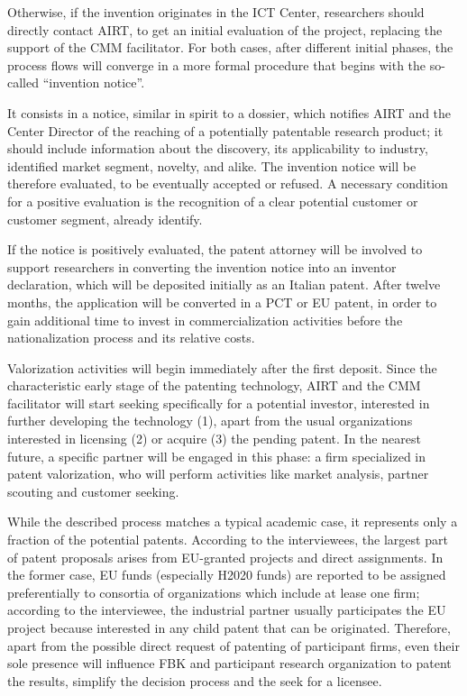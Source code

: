 Otherwise, if the invention originates in the ICT Center, researchers should directly contact AIRT, to get an initial evaluation of the project, replacing the support of the CMM facilitator. For both cases, after different initial phases, the process flows will converge in a more formal procedure that begins with the so-called \enquote{invention notice}. 

It consists in a notice, similar in spirit to a dossier, which notifies AIRT and the Center Director of the reaching of a potentially patentable research product; it should include information about the discovery, its applicability to industry, identified market segment, novelty, and alike. The invention notice will be therefore evaluated, to be eventually accepted or refused. A necessary condition for a positive evaluation is the recognition of a clear potential customer or customer segment, already identify.

If the notice is positively evaluated, the patent attorney will be involved to support researchers in converting the invention notice into an inventor declaration, which will be deposited initially as an Italian patent. After twelve months, the application will be converted in a PCT or EU patent, in order to gain additional time to invest in commercialization activities before the nationalization process and its relative costs.

Valorization activities will begin immediately after the first deposit. Since the characteristic early stage of the patenting technology, AIRT and the CMM facilitator will start seeking specifically for a potential investor, interested in further developing the technology (1), apart from the usual organizations interested in licensing (2) or acquire (3) the pending patent. In the nearest future, a specific partner will be engaged in this phase: a firm specialized in patent valorization, who will perform activities like market analysis, partner scouting and customer seeking. 

While the described process matches a typical academic case, it represents only a fraction of the potential patents. According to the interviewees, the largest part of patent proposals arises from EU-granted projects and direct assignments. In the former case, EU funds (especially H2020 funds) are reported to be assigned preferentially to consortia of organizations which include at lease one firm; according to the interviewee, the industrial partner usually participates the EU project because interested in any child patent that can be originated. Therefore, apart from the possible direct request of patenting of participant firms, even their sole presence will influence FBK and participant research organization to patent the results, simplify the decision process and the seek for a licensee. 

